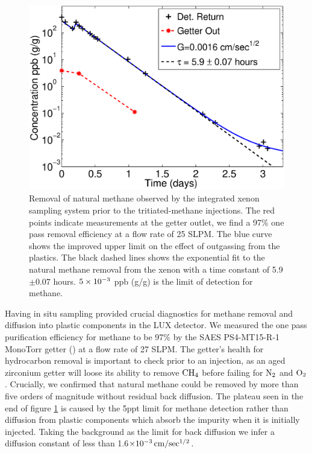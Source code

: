 \renewcommand{\baselinestretch}{1}
\small\normalsize
\begin{figure}[h!]\centering
\includegraphics[width=120mm]{Chapter_T/Figures/July_CH4_wOG.eps}
\caption{Removal of natural methane observed by the integrated xenon sampling system prior to the tritiated-methane injections. The red points indicate measurements at the getter outlet, we find a 97\% one pass removal efficiency at a flow rate of 25 SLPM. The blue curve shows the improved upper limit on the effect of outgassing from the plastics. The black dashed lines shows the exponential fit to the natural methane removal from the xenon with a time constant of 5.9 $\pm 0.07$ hours. $\rm 5\times10^{-3}$ ppb (g/g) is the limit of detection for methane.}
\label{fig:Removal_Methane}
\end{figure}
\renewcommand{\baselinestretch}{2}
\small\normalsize

Having in situ sampling provided crucial diagnostics for methane removal and diffusion into plastic components in the LUX detector. We measured the one pass purification efficiency for methane to be 97\% by the SAES PS4-MT15-R-1 MonoTorr getter (\cite{SAES}) at a flow rate of 27 SLPM. The getter's health for hydrocarbon removal is important to check prior to an injection, as an aged zirconium getter will loose its ability to remove $\rm CH_4$ before failing for $\rm N_2$ and $\rm O_2$ \cite{Dobi_CH4}. Crucially, we confirmed that natural methane could be removed by more than five orders of magnitude without residual back diffusion. The plateau seen in the end of figure \ref{fig:Removal_Methane} is caused by the 5ppt limit for methane detection rather than diffusion from plastic components which absorb the impurity when it is initially injected. Taking the background as the limit for back diffusion we infer a diffusion constant of less than 1.6$\rm \times 10^{-3} \, cm/sec^{1/2} $. 

